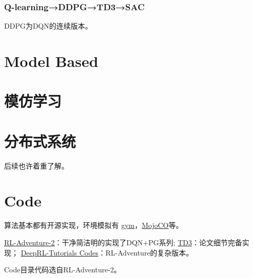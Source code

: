 \documentclass[UTF8]{ctexart}
\begin{document}
\subsubsection{Q-learning→DDPG→TD3→SAC}
DDPG为DQN的连续版本。

\section{Model Based}

\section{模仿学习}

\section{分布式系统}
后续也许着重了解。

\section{Code}
算法基本都有开源实现，环境模拟有
\href{https://gym.openai.com/}{gym}，\href{http://www.mujoco.org/}{MojoCO}等。

\href{https://github.com/higgsfield/RL-Adventure-2}{RL-Adventure-2}：干净简洁明的实现了DQN+PG系列;
\href{https://github.com/sfujim/TD3/}{TD3}：论文细节完备实现；
\href{https://github.com/cuhkrlcourse/DeepRL-Tutorials}{DeepRL-Tutorials Codes}：RL-Adventure的复杂版本。

Code目录代码选自RL-Adventure-2。
    
\end{document}
